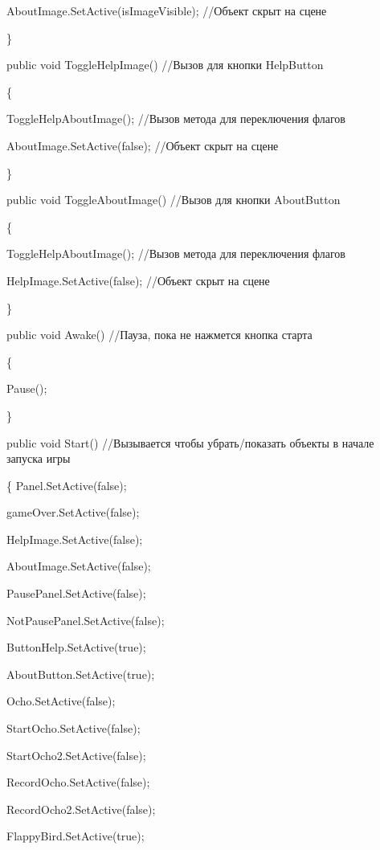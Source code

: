 \documentclass[14pt, oneside]{altsu-report}
\begin{document}
        AboutImage.SetActive(isImageVisible); //Объект скрыт на сцене

    \}

    public void ToggleHelpImage() //Вызов для кнопки HelpButton
    
    \{
    
        ToggleHelpAboutImage(); //Вызов метода для переключения флагов
        
        AboutImage.SetActive(false); //Объект скрыт на сцене
        
    \}

    public void ToggleAboutImage() //Вызов для кнопки AboutButton
    
    \{
    
        ToggleHelpAboutImage(); //Вызов метода для переключения флагов
        
        HelpImage.SetActive(false); //Объект скрыт на сцене
        
    \}
    

    public void Awake() //Пауза, пока не нажмется кнопка старта
    
    \{
    
        Pause();
        
    \}

    public void Start() //Вызывается чтобы убрать/показать объекты в начале запуска игры 
    
    \{
        Panel.SetActive(false);
        
        gameOver.SetActive(false);
        
        HelpImage.SetActive(false);
        
        AboutImage.SetActive(false);

        PausePanel.SetActive(false);
        
        NotPausePanel.SetActive(false);
        
        ButtonHelp.SetActive(true);
        
        AboutButton.SetActive(true);

        Ocho.SetActive(false);
        
        StartOcho.SetActive(false);
        
        StartOcho2.SetActive(false);
        
        RecordOcho.SetActive(false);
        
        RecordOcho2.SetActive(false);
        
        FlappyBird.SetActive(true);
\end{document}
